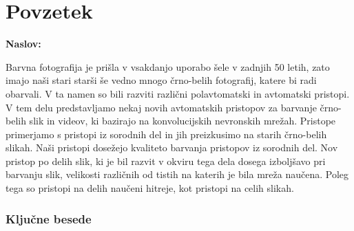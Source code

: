 \chapter*{Povzetek}

\noindent\textbf{Naslov:} \ttitle
\bigskip

Barvna fotografija je prišla v vsakdanjo uporabo šele v zadnjih 50 letih, zato imajo naši stari starši še vedno mnogo črno-belih fotografij, katere bi radi obarvali. V ta namen so bili razviti različni polavtomatski in avtomatski pristopi.
V tem delu predstavljamo nekaj novih avtomatskih pristopov za barvanje črno-belih slik in videov, ki bazirajo na konvolucijskih nevronskih mrežah. Pristope primerjamo s pristopi iz sorodnih del in jih preizkusimo na starih črno-belih slikah. 
Naši pristopi dosežejo kvaliteto barvanja pristopov iz sorodnih del. Nov pristop po delih slik, ki je bil razvit v okviru tega dela dosega izboljšavo pri barvanju slik, velikosti različnih od tistih na katerih je bila mreža naučena. Poleg tega so pristopi na delih naučeni hitreje, kot pristopi na celih slikah. 

\subsection*{Ključne besede}
\textit{\tkeywords}
\clearemptydoublepage